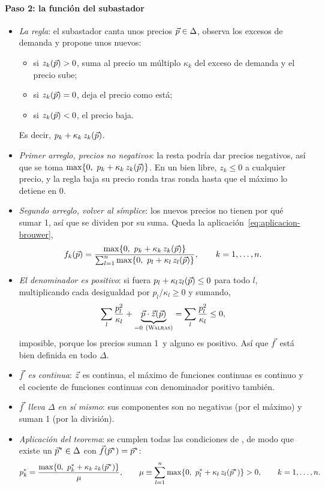 \documentclass[11pt]{article}
\begin{document}
\paragraph{Paso 2: la función del subastador}

\begin{itemize}
\item \emph{La regla}: el subastador canta unos precios $\vec{p}\in\Delta$, observa los excesos de demanda y propone unos nuevos:
  \begin{itemize}
  \item si $z_k(\vec{p})>0$, suma al precio un múltiplo $\kappa_k$ del exceso de demanda y el precio sube;
  \item si $z_k(\vec{p})=0$, deja el precio como está;
  \item si $z_k(\vec{p})<0$, el precio baja.
  \end{itemize}
  Es decir, $p_k+\kappa_k\,z_k(\vec{p})$.
\item \emph{Primer arreglo, precios no negativos}: la resta podría dar precios negativos, así que se toma $\max\{0,\ p_k+\kappa_k\,z_k(\vec{p})\}$. En un bien libre, $z_k\leq 0$ a cualquier precio, y la regla baja su precio ronda tras ronda hasta que el máximo lo detiene en 0.
\item \emph{Segundo arreglo, volver al símplice}: los nuevos precios no tienen por qué sumar 1, así que se dividen por su suma. Queda la aplicación~\eqref{eq:aplicacion-brouwer},
  \begin{equation*}
  f_k(\vect{p})=\frac{\max\{0,\ p_k+\kappa_k\,z_k(\vect{p})\}}{\sum_{l=1}^{n}\max\{0,\ p_l+\kappa_l\,z_l(\vect{p})\}},\qquad k=1,\dots,n.
  \end{equation*}
\item \emph{El denominador es positivo}: si fuera $p_l+\kappa_lz_l(\vec{p})\leq 0$ para todo $l$, multiplicando cada desigualdad por $p_l/\kappa_l\geq 0$ y sumando,
  \[
  \sum_l\frac{p_l^2}{\kappa_l}+\underbrace{\vect{p}\cdot\vect{z}(\vect{p})}_{=0\ \text{(\autor{Walras})}}=\sum_l\frac{p_l^2}{\kappa_l}\leq 0,
  \]
  imposible, porque los precios suman 1~y alguno es positivo. Así que $\vec{f}$ está bien definida en todo $\Delta$.
\item \emph{$\vec{f}$ es continua}: $\vec{z}$ es continua, el máximo de funciones continuas es continuo y el cociente de funciones continuas con denominador positivo también.
\item \emph{$\vec{f}$ lleva $\Delta$ en sí mismo}: sus componentes son no negativas (por el máximo) y suman 1 (por la división).
\item \emph{Aplicación del teorema}: se cumplen todas las condiciones de , de modo que existe un $\vec{p}^*\in\Delta$ con $\vec{f}(\vec{p}^*)=\vec{p}^*$:
  \begin{equation}
  p^*_k=\frac{\max\{0,\ p^*_k+\kappa_k\,z_k(\vect{p}^*)\}}{\mu},\qquad \mu\equiv\sum_{l=1}^{n}\max\{0,\ p^*_l+\kappa_l\,z_l(\vect{p}^*)\}>0,\qquad k=1,\dots,n. \label{eq:punto-fijo}
  \end{equation}
\end{itemize}
\end{document}
